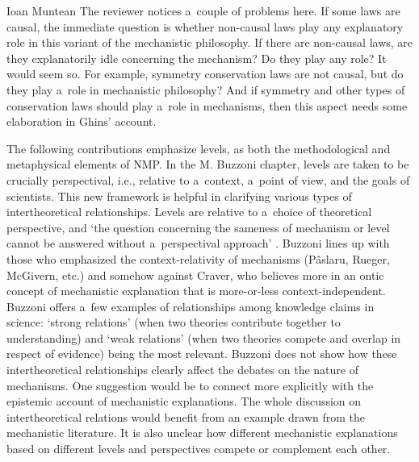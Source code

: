\begin{recengenv}{Ioan Muntean}
\enlargethispage{1.5\baselineskip}
The reviewer notices a~couple of problems here. If some laws are causal, the immediate question is whether non-causal laws play any explanatory role in this variant of the mechanistic philosophy. If there are non-causal laws, are they explanatorily idle concerning the mechanism? Do they play any role? It would seem so. For example, symmetry conservation laws are not causal, but do they play a~role in mechanistic philosophy? And if symmetry and other types of conservation laws should play a~role in mechanisms, then this aspect needs some elaboration in Ghins' account.

The following contributions emphasize levels, as both the methodological and metaphysical elements of NMP. In the M. Buzzoni chapter, levels are taken to be crucially perspectival, i.e., relative to a~context, a~point of view, and the goals of scientists. This new framework is helpful in clarifying various types of intertheoretical relationships. Levels are relative to a~choice of theoretical perspective, and ‘the question concerning the sameness of mechanism or level cannot be answered without a~perspectival approach'
\parencite*[][p.118]{falkenburg_mechanistic_2019}. %
 Buzzoni lines up with those who emphasized the context-relativity of mechanisms (Pâslaru, Rueger, McGivern, etc.) and somehow against Craver, who believes more in an ontic concept of mechanistic explanation that is more-or-less context-independent. Buzzoni offers a~few examples of relationships among knowledge claims in science: ‘strong relations' (when two theories contribute together to understanding) and ‘weak relations' (when two theories compete and overlap in respect of evidence) being the most relevant. Buzzoni does not show how these intertheoretical relationships clearly affect the debates on the nature of mechanisms. One suggestion would be to connect more explicitly with the epistemic account of mechanistic explanations. The whole discussion on intertheoretical relations would benefit from an example drawn from the mechanistic literature. It is also unclear how different mechanistic explanations based on different levels and perspectives compete or complement each other.


\end{recengenv}
